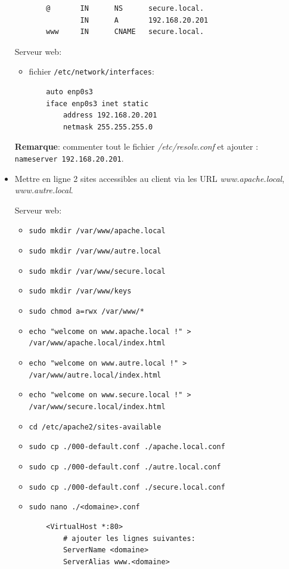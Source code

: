 \documentclass[a4paper]{article}
\begin{document}
\begin{itemize}
\begin{example}
\begin{itemize}
\begin{verbatim}
    @       IN      NS      secure.local.
            IN      A       192.168.20.201
    www     IN      CNAME   secure.local.
        \end{verbatim}
    \end{itemize}
    Serveur web:
    \begin{itemize}
        \item fichier \texttt{/etc/network/interfaces}:
        \begin{verbatim}
    auto enp0s3
    iface enp0s3 inet static
        address 192.168.20.201
        netmask 255.255.255.0
        \end{verbatim}
    \end{itemize}
    \textbf{Remarque}: commenter tout le fichier \textit{/etc/resolv.conf} et ajouter : \texttt{nameserver 192.168.20.201}.
\end{example}

\item Mettre en ligne 2 sites accessibles au client via les URL \textit{www.apache.local}, \textit{www.autre.local}.
\begin{example}
    Serveur web:
    \begin{itemize}
        \item \texttt{sudo mkdir /var/www/apache.local}
        \item \texttt{sudo mkdir /var/www/autre.local}
        \item \texttt{sudo mkdir /var/www/secure.local}
        \item \texttt{sudo mkdir /var/www/keys}
        \item \texttt{sudo chmod a=rwx /var/www/*}
        \item \texttt{echo "welcome on www.apache.local !" > /var/www/apache.local/index.html}
        \item \texttt{echo "welcome on www.autre.local !" > /var/www/autre.local/index.html}
        \item \texttt{echo "welcome on www.secure.local !" > /var/www/secure.local/index.html}
        \item \texttt{cd /etc/apache2/sites-available}
        \item \texttt{sudo cp ./000-default.conf ./apache.local.conf}
        \item \texttt{sudo cp ./000-default.conf ./autre.local.conf}
        \item \texttt{sudo cp ./000-default.conf ./secure.local.conf}
        \item \texttt{sudo nano ./<domaine>.conf}
        \begin{verbatim}
    <VirtualHost *:80>
        # ajouter les lignes suivantes:
        ServerName <domaine>
        ServerAlias www.<domaine>


\end{verbatim}
\end{itemize}
\end{example}
\end{itemize}
\end{document}
